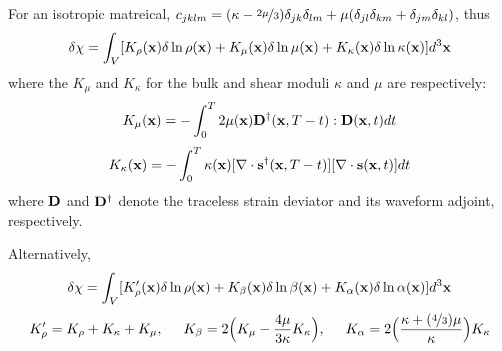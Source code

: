For an isotropic matreical,
$c_{jklm}=(\kappa-\nicefrac{2\mu}{3})\delta_{jk}\delta_{lm}+\mu(\delta_{jl}\delta_{km}+\delta_{jm}\delta_{kl})$,
thus
\[ \delta\chi=\int_V[K_\rho(\mathbf{x})\delta\ln\rho(\mathbf{x})+K_\mu(\mathbf{x})\delta\ln\mu(\mathbf{x})+K_\kappa(\mathbf{x})\delta\ln\kappa(\mathbf{x})]d^3\mathbf{x} \]
where the  $K_\mu$ and $K_\kappa$
for the bulk and shear moduli $\kappa$ and $\mu$ are respectively:
\[ K_\mu(\mathbf{x})=-\int_0^T2\mu(\mathbf{x})\mathbf{D}^\dagger(\mathbf{x},T-t):\mathbf{D}(\mathbf{x},t)dt \]
\[ K_\kappa(\mathbf{x})=-\int_0^T\kappa(\mathbf{x})[\nabla\cdot\mathbf{s}^\dagger(\mathbf{x},T-t)][\nabla\cdot\mathbf{s}(\mathbf{x},t)]dt \]
where $\mathbf{D}$ and $\mathbf{D}^\dagger$
denote the traceless strain deviator and its waveform adjoint, respectively.

Alternatively,
\[ \delta\chi=\int_V[K_\rho^\prime(\mathbf{x})\delta\ln\rho(\mathbf{x})+K_\beta(\mathbf{x})\delta\ln\beta(\mathbf{x})+K_\alpha(\mathbf{x})\delta\ln\alpha(\mathbf{x})]d^3\mathbf{x} \]
\[ K_\rho^\prime=K_\rho+K_\kappa+K_\mu, \hspace{5mm} K_\beta=2\Big(K_\mu-\frac{4\mu}{3\kappa}K_\kappa\Big), \hspace{5mm} K_\alpha=2\Big(\frac{\kappa+(\nicefrac{4}{3})\mu}{\kappa}\Big)K_\kappa \]

